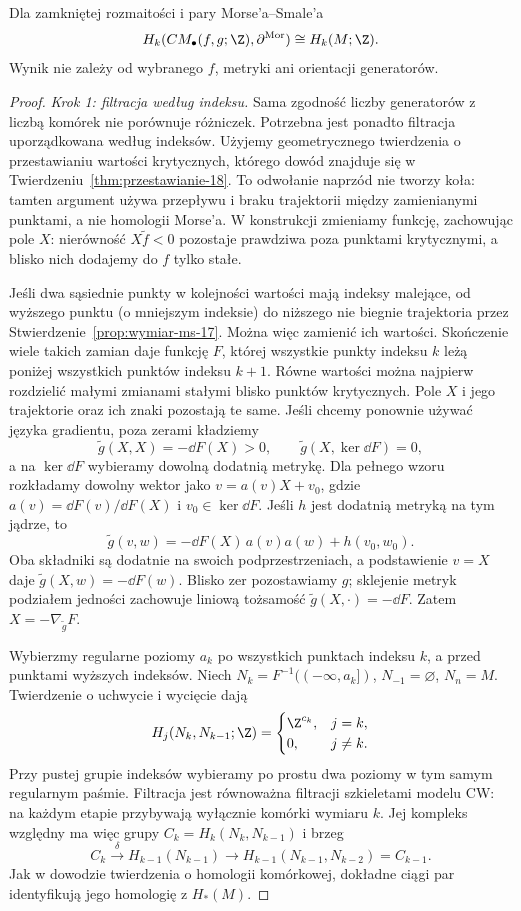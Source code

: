 \begin{twierdzenie}
\label{thm:homologia-morse-17}
Dla zamkniętej rozmaitości
i pary Morse'a--Smale'a
\[
 H_k(CM_\bullet(f,g;\Z),
          \partial^{\mathrm{Mor}})
       \cong H_k(M;\Z).
\]
Wynik nie zależy od
wybranego $f$, metryki
ani orientacji generatorów.
\end{twierdzenie}
\begin{proof}
\emph{Krok 1: filtracja według indeksu.}
Sama zgodność liczby generatorów z liczbą komórek
nie porównuje różniczek. Potrzebna jest ponadto
filtracja uporządkowana według indeksów.
Użyjemy geometrycznego twierdzenia o przestawianiu
wartości krytycznych, którego dowód znajduje się
w Twierdzeniu~\ref{thm:przestawianie-18}.
To odwołanie naprzód nie tworzy koła: tamten argument
używa przepływu i braku trajektorii między zamienianymi
punktami, a nie homologii Morse'a.
W konstrukcji zmieniamy funkcję, zachowując pole $X$:
nierówność $X\widetilde f<0$ pozostaje prawdziwa
poza punktami krytycznymi, a blisko nich dodajemy
do $f$ tylko stałe.

Jeśli dwa sąsiednie punkty w kolejności wartości
mają indeksy malejące, od wyższego punktu
(o mniejszym indeksie) do niższego nie biegnie
trajektoria przez Stwierdzenie~\ref{prop:wymiar-ms-17}.
Można więc zamienić ich wartości. Skończenie wiele
takich zamian daje funkcję $F$, której wszystkie
punkty indeksu $k$ leżą poniżej wszystkich punktów
indeksu $k+1$. Równe wartości można najpierw rozdzielić
małymi zmianami stałymi blisko punktów krytycznych.
Pole $X$ i jego trajektorie oraz ich znaki pozostają te same.
Jeśli chcemy ponownie używać języka gradientu,
poza zerami kładziemy
\[
 \widetilde g(X,X)=-\dd F(X)>0,\qquad
 \widetilde g(X,\ker\dd F)=0,
\]
a na $\ker\dd F$ wybieramy dowolną dodatnią metrykę.
Dla pełnego wzoru rozkładamy dowolny wektor jako
$v=a(v)X+v_0$, gdzie
$a(v)=\dd F(v)/\dd F(X)$ i $v_0\in\ker\dd F$.
Jeśli $h$ jest dodatnią metryką na tym jądrze, to
\[
 \widetilde g(v,w)
 =-\dd F(X)\,a(v)a(w)+h(v_0,w_0).
\]
Oba składniki są dodatnie na swoich podprzestrzeniach,
a podstawienie $v=X$ daje
$\widetilde g(X,w)=-\dd F(w)$.
Blisko zer pozostawiamy $g$; sklejenie metryk podziałem
jedności zachowuje liniową tożsamość
$\widetilde g(X,\cdot)=-\dd F$.
Zatem $X=-\nabla_{\widetilde g}F$.

Wybierzmy regularne poziomy $a_k$ po wszystkich
punktach indeksu $k$, a przed punktami wyższych indeksów.
Niech $N_k=F^{-1}(( -\infty,a_k])$,
$N_{-1}=\varnothing$, $N_n=M$.
Twierdzenie o uchwycie i wycięcie dają
\[
 H_j(N_k,N_{k-1};\Z)=
 \begin{cases}\Z^{c_k},&j=k,\\0,&j\ne k.\end{cases}
\]
Przy pustej grupie indeksów wybieramy po prostu
dwa poziomy w tym samym regularnym paśmie.
Filtracja jest równoważna filtracji szkieletami
modelu CW: na każdym etapie przybywają wyłącznie
komórki wymiaru $k$. Jej kompleks względny ma więc
grupy $C_k=H_k(N_k,N_{k-1})$ i brzeg
\[
 C_k\xrightarrow{\delta}H_{k-1}(N_{k-1})
       \longrightarrow H_{k-1}(N_{k-1},N_{k-2})=C_{k-1}.
\]
Jak w dowodzie twierdzenia o homologii komórkowej,
dokładne ciągi par identyfikują jego homologię z $H_*(M)$.


\end{proof}
